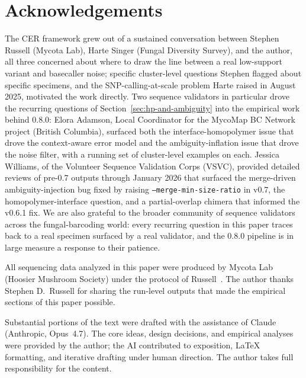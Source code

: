 \documentclass[11pt]{article}
\begin{document}
\section*{Acknowledgements}

The CER framework grew out of a sustained conversation between Stephen
Russell (Mycota Lab), Harte Singer (Fungal Diversity Survey), and the
author, all three concerned about where to draw the line between a real
low-support variant and basecaller noise; specific cluster-level questions
Stephen flagged about specific specimens, and the SNP-calling-at-scale
problem Harte raised in August 2025, motivated the work directly. Two
sequence validators in particular drove the recurring questions of
Section~\ref{sec:hp-and-ambiguity} into the empirical work behind 0.8.0:
Elora Adamson, Local Coordinator for the MycoMap BC Network project
(British Columbia), surfaced both the interface-homopolymer issue that
drove the context-aware error model and the ambiguity-inflation issue
that drove the noise filter, with a running set of cluster-level
examples on each. Jessica Williams, of the Volunteer Sequence Validation
Corps (VSVC), provided detailed reviews of pre-0.7 outputs through
January 2026 that surfaced the merge-driven ambiguity-injection bug
fixed by raising \texttt{--merge-min-size-ratio} in v0.7, the
homopolymer-interface question, and a partial-overlap chimera that
informed the v0.6.1 fix. We are also grateful to the broader community
of sequence validators across the fungal-barcoding world: every
recurring question in this paper traces back to a real specimen
surfaced by a real validator, and the 0.8.0 pipeline is in large
measure a response to their patience.

All sequencing data analyzed in this paper were produced by Mycota Lab
(Hoosier Mushroom Society) under the protocol of
Russell~\cite{russell2023}. The author thanks Stephen D.~Russell for
sharing the run-level outputs that made the empirical sections of this
paper possible.

Substantial portions of the text were drafted with the assistance of
Claude (Anthropic, Opus~4.7). The core ideas, design decisions, and
empirical analyses were provided by the author; the AI contributed to
exposition, \LaTeX{} formatting, and iterative drafting under human
direction. The author takes full responsibility for the content.
\end{document}
